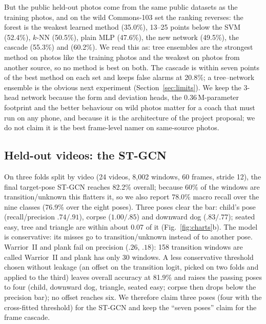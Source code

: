 But the public held-out photos come from the same public datasets as the training photos, and on the wild Commons-103 set the ranking reverses: the forest is the weakest learned method (35.0\%), 13--25 points below the SVM (52.4\%), $k$-NN (50.5\%), plain MLP (47.6\%), the new network (49.5\%), the cascade (55.3\%) and \vfour{} (60.2\%). We read this as: tree ensembles are the strongest method on photos like the training photos and the weakest on photos from another source, so no method is best on both. The cascade is within seven points of the best method on each set and keeps false alarms at 20.8\%; a tree--network ensemble is the obvious next experiment (Section~\ref{sec:limits}). We keep the 3-head network because the form and deviation heads, the 0.36\,M-parameter footprint and the better behaviour on wild photos matter for a coach that must run on any phone, and because it is the architecture of the project proposal; we do not claim it is the best frame-level namer on same-source photos.

\subsection{Held-out videos: the ST-GCN}
On three folds split by video (24 videos, 8{,}002 windows, 60 frames, stride 12), the final target-pose ST-GCN reaches 82.2\% overall; because 60\% of the windows are transition/unknown this flatters it, so we also report 78.0\% macro recall over the nine classes (76.9\% over the eight poses). Three poses clear the bar: child's pose (recall/precision $.74/.91$), corpse ($1.00/.85$) and downward dog ($.83/.77$); seated easy, tree and triangle are within about 0.07 of it (Fig.~\ref{fig:charts}b). The model is conservative: its misses go to transition/unknown instead of to another pose. Warrior~II and plank fail on precision ($.26$, $.18$): 158 transition windows are called Warrior~II and plank has only 30 windows. A less conservative threshold chosen without leakage (an offset on the transition logit, picked on two folds and applied to the third) leaves overall accuracy at 81.9\% and raises the passing poses to four (child, downward dog, triangle, seated easy; corpse then drops below the precision bar); no offset reaches six. We therefore claim three poses (four with the cross-fitted threshold) for the ST-GCN and keep the ``seven poses'' claim for the frame cascade.

